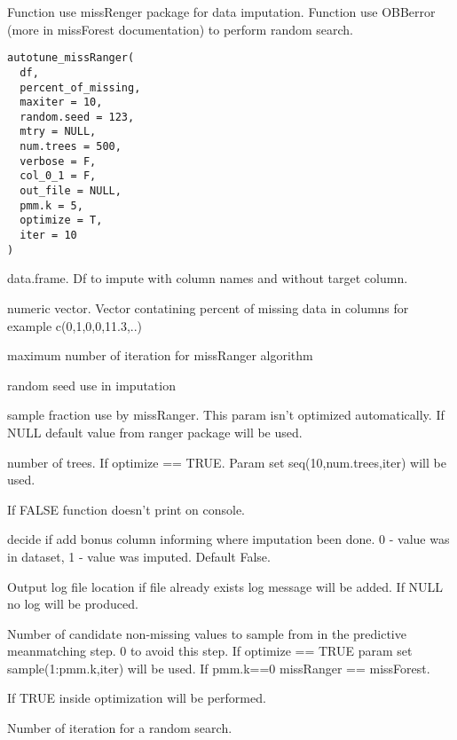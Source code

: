\documentclass[letterpaper]{book}
\begin{document}
%
\begin{Description}\relax
Function use missRenger package for data imputation. Function use OBBerror (more in missForest documentation) to perform random search.
\end{Description}
%
\begin{Usage}
\begin{verbatim}
autotune_missRanger(
  df,
  percent_of_missing,
  maxiter = 10,
  random.seed = 123,
  mtry = NULL,
  num.trees = 500,
  verbose = F,
  col_0_1 = F,
  out_file = NULL,
  pmm.k = 5,
  optimize = T,
  iter = 10
)
\end{verbatim}
\end{Usage}
%
\begin{Arguments}
\begin{ldescription}
\item[\code{df}] data.frame. Df to impute with column names and without target column.

\item[\code{percent\_of\_missing}] numeric vector. Vector contatining percent of missing data in columns for example  c(0,1,0,0,11.3,..)

\item[\code{maxiter}] maximum number of iteration for missRanger algorithm

\item[\code{random.seed}] random seed use in imputation

\item[\code{mtry}] sample fraction use by missRanger. This param isn't optimized automatically. If NULL default value from ranger package will be used.

\item[\code{num.trees}] number of trees. If optimize == TRUE. Param set seq(10,num.trees,iter) will be used.

\item[\code{verbose}] If FALSE function doesn't print on console.

\item[\code{col\_0\_1}] decide if add bonus column informing where imputation been done. 0 - value was in dataset, 1 - value was imputed. Default False.

\item[\code{out\_file}] Output log file location if file already exists log message will be added. If NULL no log will be produced.

\item[\code{pmm.k}] Number of candidate non-missing values to sample from in the predictive meanmatching step. 0 to avoid this step. If optimize == TRUE param set sample(1:pmm.k,iter) will be used. If pmm.k==0 missRanger == missForest.

\item[\code{optimize}] If TRUE inside optimization will be performed.

\item[\code{iter}] Number of iteration for a random search.
\end{ldescription}
\end{Arguments}
\end{document}
